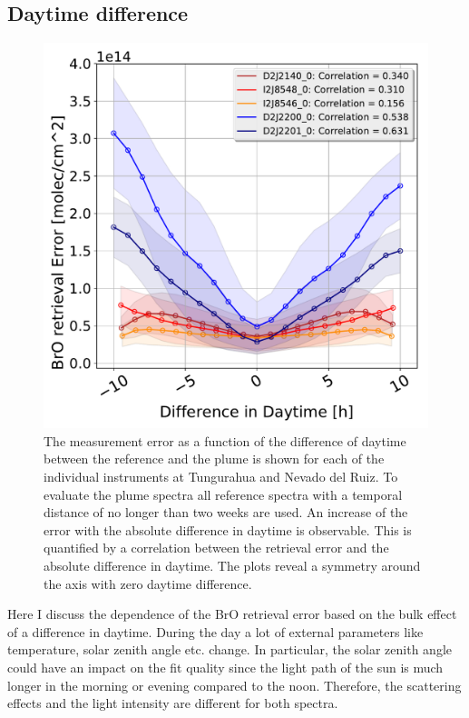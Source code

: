 \subsection{ Daytime difference \label{chap:daytime}}
\begin{figure}
    \centering
    \includegraphics[width=0.7\linewidth]{Bilder/DiffDaytimeallInstruments}
    \caption[The  measurement error as a function of the difference of daytime between the reference and the plume is shown for each of the individual instruments at Tungurahua and Nevado del Ruiz.]{The  measurement error as a function of the difference of daytime between the reference and the plume is shown for each of the individual instruments at Tungurahua and Nevado del Ruiz. To evaluate the plume spectra all reference spectra with a temporal distance of no longer than two weeks are used. An increase of the  error with the absolute difference in daytime is observable. This is quantified by a correlation between the  retrieval error and the absolute difference in daytime. The plots reveal a symmetry around the axis with zero daytime difference. }
    \label{fig:diffdaytime}
\end{figure}
Here I discuss the dependence of the BrO retrieval error based on the bulk effect of a difference in daytime. During the day a lot of external parameters like temperature, solar zenith angle etc. change. In particular, the solar zenith angle could have an impact on the fit quality since the light path of the sun is much longer in the morning or evening compared to the noon. Therefore, the scattering effects and the light intensity are different for both spectra.\\

